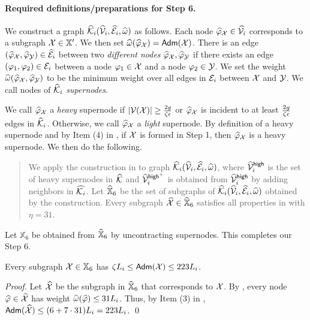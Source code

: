 \paragraph{Required definitions/preparations for Step 6.~} We construct a graph $\widehat{\mathcal{K}}_i(\widehat{\mathcal{V}}_i, \widehat{\mathcal{E}}_i, \widehat{\omega})$ as follows. Each node $\widehat{\varphi}_{\mathcal{X}} \in \widehat{\mathcal{V}_i}$ corresponds to a subgraph $\mathcal{X} \in \mathbb{X}'$.  We then set $\widehat{\omega}(\widehat{\varphi}_{\mathcal{X}}) = \mathsf{Adm}(\mathcal{X})$.  There is an edge $(\widehat{\varphi}_{\mathcal{X}},\widehat{\varphi}_{\mathcal{Y}}) \in \widehat{\mathcal{E}}_i$ between two \emph{different nodes} $\widehat{\varphi}_{\mathcal{X}},\widehat{\varphi}_{\mathcal{Y}}$  if there exists an edge $(\varphi_1,\varphi_2) \in \mathcal{E}_i$ between a node $\varphi_1 \in \mathcal{X}$ and a node $\varphi_2 \in \mathcal{Y}$. We set the weight $\widehat{\omega}(\widehat{\varphi}_{\mathcal{X}},\widehat{\varphi}_{\mathcal{Y}})$ to be the minimum weight over all edges in $\mathcal{E}_i$ between $\mathcal{X}$ and $\mathcal{Y}$. We call nodes of $\widehat{\mathcal{K}}_i$ \emph{supernodes}.


We call $\widehat{\varphi}_{\mathcal{X}}$ a \emph{heavy} supernode if $|\mathcal{V}(\mathcal{X})|\geq \frac{2g}{\zeta\epsilon}$ or $\widehat{\varphi}_{\mathcal{X}}$ is incident to at least $\frac{2g}{\zeta\epsilon}$ edges in $\widehat{\mathcal{K}}_i$. Otherwise, we call  $\widehat{\varphi}_{\mathcal{X}}$ a \emph{light} supernode. By definition of a heavy supernode and by Item (4) in , if $\mathcal{X}$ is formed in Step 1, then  $\widehat{\varphi}_{\mathcal{X}}$  is a heavy supernode. We then do the following.

\begin{quote}
	We apply the construction in  to graph $\widehat{\mathcal{K}}_i(\widehat{\mathcal{V}}_i, \widehat{\mathcal{E}}_i, \widehat{\omega})$, where $\widehat{\mathcal{V}}_i^{\mathsf{high}}$ is the set of heavy supernodes in $\widehat{\mathcal{K}}$ and  $\widehat{\mathcal{V}}_i^{\mathsf{high}^+}$ is obtained from  $\widehat{\mathcal{V}}_i^{\mathsf{high}}$ by adding neighbors in $\widehat{\mathcal{K}_i}$. Let $\widehat{\mathbb{X}}_6$ be the set of subgraphs of $\widehat{\mathcal{K}}_i(\widehat{\mathcal{V}}_i, \widehat{\mathcal{E}}_i, \widehat{\omega})$ obtained by the construction. Every subgraph $\widehat{\mathcal{X}} \in \widehat{\mathbb{X}}_6$ satisfies all properties in  with $\eta = 31$.
\end{quote}

 Let $\mathbb{X}_6$ be obtained from $\widehat{\mathbb{X}}_6$ by uncontracting supernodes. This completes our Step 6.
 
 \begin{lemma}\label{lm:Step6-T2-Prop} Every subgraph $\mathcal{X} \in \mathbb{X}_6$ has $\zeta L_i \leq \mathsf{Adm}(\mathcal{X}) \leq 223L_i$.
 \end{lemma}
 \begin{proof}
 	Let $\widehat{\mathcal{X}}$ be the subgraph in $\widehat{\mathbb{X}}_6$ that corresponds to $\mathcal{X}$. By , every node $\widehat{\varphi} \in \widehat{\mathcal{X}}$ has weight $\widehat{\omega}(\widehat{\varphi}) \leq 31L_i$. Thus, by Item (3) in , $\mathsf{Adm}(\widehat{\mathcal{X}})\leq (6 + 7\cdot  31)L_i = 223L_i$.	  \qed
 \end{proof}
 

